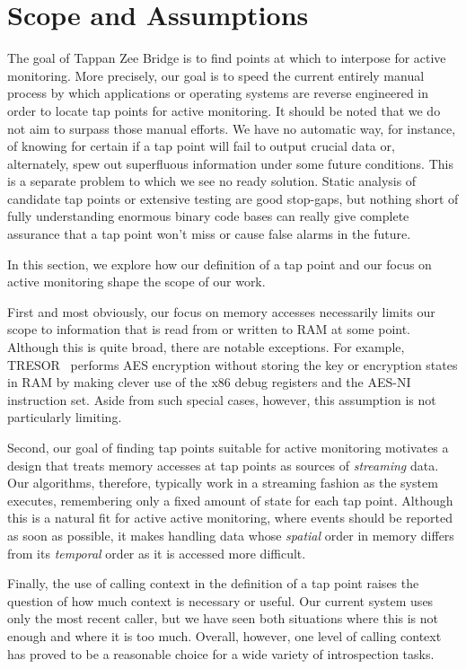 \section{Scope and Assumptions}
\label{sec:scope}

The goal of Tappan Zee Bridge is to find points at which to interpose
for active monitoring. More precisely, our goal is to speed the current
entirely manual process by which applications or operating systems are
reverse engineered in order to locate tap points for active monitoring.
It should be noted that we do not aim to surpass those manual efforts.
We have no automatic way, for instance, of knowing for certain if a tap
point will fail to output crucial data or, alternately, spew out
superfluous information under some future conditions. This is a separate
problem to which we see no ready solution. Static analysis of candidate
tap points or extensive testing are good stop-gaps, but nothing short of
fully understanding enormous binary code bases can really give complete
assurance that a tap point won't miss or cause false alarms in the
future. 

In this section, we explore how our definition of a tap point and our
focus on active monitoring shape the scope of our work.

First and most obviously, our focus on memory accesses necessarily
limits our scope to information that is read from or written to RAM at
some point. Although this is quite broad, there are notable exceptions.
For example, TRESOR~\cite{Muller:2011} performs AES encryption without
storing the key or encryption states in RAM by making clever use of the
x86 debug registers and the AES-NI instruction set. Aside from such
special cases, however, this assumption is not particularly limiting.

Second, our goal of finding tap points suitable for active monitoring
motivates a design that treats memory accesses at tap points as sources
of \emph{streaming} data. Our algorithms, therefore, typically work in a
streaming fashion as the system executes, remembering only a fixed
amount of state for each tap point. Although this is a natural fit for
active active monitoring, where events should be reported as soon as
possible, it makes handling data whose \emph{spatial} order in memory
differs from its \emph{temporal} order as it is accessed more difficult.

Finally, the use of calling context in the definition of a tap point
raises the question of how much context is necessary or useful. Our
current system uses only the most recent caller, but we have seen
both situations where this is not enough and where it is too much.
Overall, however, one level of calling context has proved to be a
reasonable choice for a wide variety of introspection tasks.

